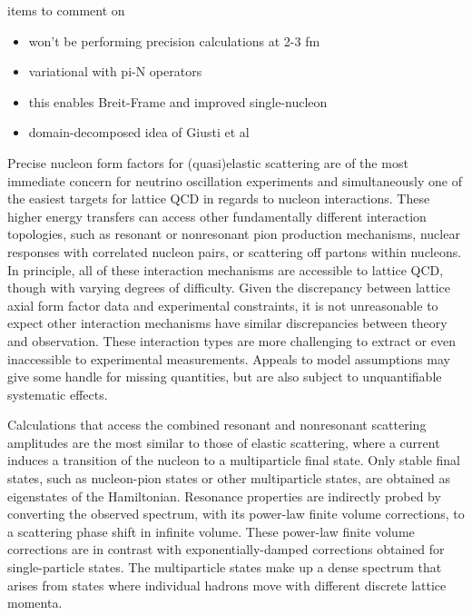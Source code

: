 {\color{red}items to comment on}
\begin{itemize}
\item won't be performing precision calculations at 2-3 fm
\item variational with pi-N operators
\item this enables Breit-Frame and improved single-nucleon
\item domain-decomposed idea of Giusti et al
\end{itemize}


Precise nucleon form factors for (quasi)elastic scattering are of the most immediate concern
 for neutrino oscillation experiments and simultaneously one of the easiest
 targets for lattice QCD in regards to nucleon interactions.
These higher energy transfers can access other fundamentally different interaction topologies,
 such as resonant or nonresonant pion production mechanisms,
 nuclear responses with correlated nucleon pairs,
 or scattering off partons within nucleons.
In principle, all of these interaction mechanisms are accessible to lattice QCD,
 though with varying degrees of difficulty.
Given the discrepancy between lattice axial form factor data and experimental constraints,
 it is not unreasonable to expect other interaction mechanisms have similar discrepancies
 between theory and observation.
These interaction types are more challenging to extract or even inaccessible to
 experimental measurements.
Appeals to model assumptions may give some handle for missing quantities,
 but are also subject to unquantifiable systematic effects.

Calculations that access the combined resonant and nonresonant scattering amplitudes
 are the most similar to those of elastic scattering,
 where a current induces a transition of the nucleon to a multiparticle final state.
Only stable final states, such as nucleon-pion states or other multiparticle states,
 are obtained as eigenstates of the Hamiltonian.
Resonance properties are indirectly probed by converting the observed spectrum,
 with its power-law finite volume corrections, to a scattering phase shift in infinite volume.
These power-law finite volume corrections are in contrast with exponentially-damped
 corrections obtained for single-particle states.
The multiparticle states make up a dense spectrum that arises from
 states where individual hadrons move with different discrete lattice momenta.

